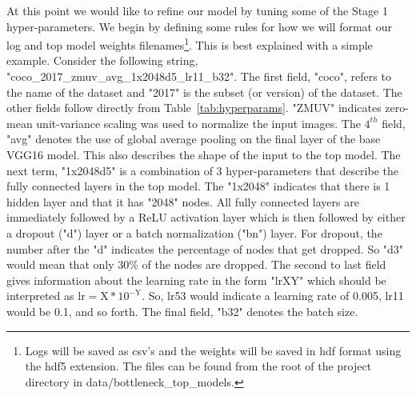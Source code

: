 \documentclass[12pt,journal,compsoc]{IEEEtran}
\begin{document}

At this point we would like to refine our model by tuning some of the Stage 1 hyper-parameters.  We begin by defining some rules for how we will format our log and top model weights filenames\footnote{Logs will be saved as csv's and the weights will be saved in hdf format using the hdf5 extension. The files can be found from the root of the project directory in data/bottleneck\_top\_models.}. This is best explained with a simple example. Consider the following string, "coco\_2017\_zmuv\_avg\_1x2048d5\_lr11\_b32". The first field, "coco", refers to the name of the dataset and "2017" is the subset (or version) of the dataset. The other fields follow directly from Table~\ref{tab:hyperparams}. "ZMUV" indicates zero-mean unit-variance scaling was used to normalize the input images. The $4^{th}$ field, "avg" denotes the use of global average pooling on the final layer of the base VGG16 model. This also describes the shape of the input to the top model. The next term, "1x2048d5" is a combination of 3 hyper-parameters that describe the fully connected layers in the top model. The "1x2048" indicates that there is 1 hidden layer and that it has "2048" nodes.  All fully connected layers are immediately followed by a ReLU activation layer which is then followed by either a dropout ("d") layer or a batch normalization ("bn") layer. For dropout, the number after the "d" indicates the percentage of nodes that get dropped. So "d3" would mean that only 30\% of the nodes are dropped. The second to last field gives information about the learning rate in the form "lrXY" which should be interpreted as $\mathrm{lr = X * 10^{-Y}}$.  So, lr53 would indicate a learning rate of 0.005, lr11 would be 0.1, and so forth. The final field, "b32" denotes the batch size.
\end{document}
